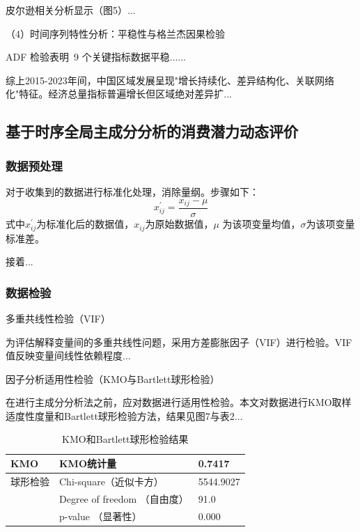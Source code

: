 \documentclass[UTF8,a4paper,zihao=-4,AutoFakeBold]{ctexart}
\begin{document}
	皮尔逊相关分析显示（图5）...
	
	（4）时间序列特性分析：平稳性与格兰杰因果检验
	
	ADF 检验表明 9 个关键指标数据平稳......
	
	综上2015-2023年间，中国区域发展呈现"增长持续化、差异结构化、关联网络化"特征。经济总量指标普遍增长但区域绝对差异扩...
	
	\subsection{基于时序全局主成分分析的消费潜力动态评价}
	\subsubsection{数据预处理}
	对于收集到的数据进行标准化处理，消除量纲。步骤如下：
	\begin{equation}
		x_{ij}^{\prime}=\frac{x_{ij}-\mu}{\sigma}
	\end{equation}
	式中$	x_{ij}^{\prime}$为标准化后的数据值，$x_{ij}$为原始数据值，$\mu$ 为该项变量均值，$\sigma$为该项变量标准差。
	
	接着...
	
	\subsubsection{数据检验}
	多重共线性检验（VIF）
	
	为评估解释变量间的多重共线性问题，采用方差膨胀因子（VIF）进行检验。VIF值反映变量间线性依赖程度...
	
	因子分析适用性检验（KMO与Bartlett球形检验）
	
	在进行主成分分析法之前，应对数据进行适用性检验。本文对数据进行KMO取样适度性度量和Bartlett球形检验方法，结果见图7与表2...
	
	\begin{table}[H]
		\centering
		\caption{KMO和Bartlett球形检验结果}
		\renewcommand\arraystretch{1}
		\begin{tabular}{C{3.3cm}C{5cm}C{2.8cm}}
			\toprule[1.5pt] %
			KMO    & KMO统计量   & 0.7417  \\
			\midrule[1.5pt] 
			球形检验  &  Chi-square（近似卡方）    &  5544.9027      \\
			&  Degree of freedom （自由度）    &  91.0      \\
			&  p-value （显著性）    &  0.000     \\
			\bottomrule[1.5pt] %
		\end{tabular}
	\end{table}
	
\end{document}
